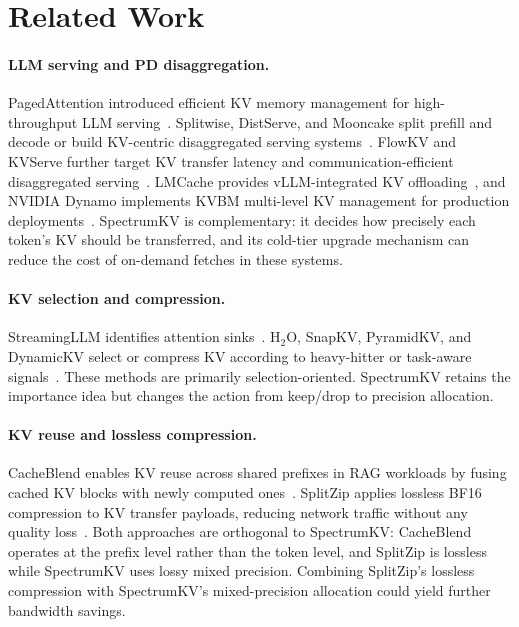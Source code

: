 \documentclass[11pt]{article}
\newcommand{\method}{SpectrumKV}
\theoremstyle{plain}
\theoremstyle{definition}
\begin{document}
\section{Related Work}
\label{sec:related}

\paragraph{LLM serving and PD disaggregation.}
PagedAttention introduced efficient KV memory management for high-throughput LLM serving~\citep{pagedattention}.  Splitwise, DistServe, and Mooncake split prefill and decode or build KV-centric disaggregated serving systems~\citep{splitwise,distserve,mooncake}.  FlowKV and KVServe further target KV transfer latency and communication-efficient disaggregated serving~\citep{flowkv,kvserve}.  LMCache provides vLLM-integrated KV offloading~\citep{lmcache}, and NVIDIA Dynamo implements KVBM multi-level KV management for production deployments~\citep{nvidiadynamo}.  \method{} is complementary: it decides how precisely each token's KV should be transferred, and its cold-tier upgrade mechanism can reduce the cost of on-demand fetches in these systems.

\paragraph{KV selection and compression.}
StreamingLLM identifies attention sinks~\citep{streamingllm}.  H$_2$O, SnapKV, PyramidKV, and DynamicKV select or compress KV according to heavy-hitter or task-aware signals~\citep{h2o,snapkv,pyramidkv,dynamickv}.  These methods are primarily selection-oriented.  \method{} retains the importance idea but changes the action from keep/drop to precision allocation.

\paragraph{KV reuse and lossless compression.}
CacheBlend enables KV reuse across shared prefixes in RAG workloads by fusing cached KV blocks with newly computed ones~\citep{cacheblend}.  SplitZip applies lossless BF16 compression to KV transfer payloads, reducing network traffic without any quality loss~\citep{splitzip}.  Both approaches are orthogonal to \method{}: CacheBlend operates at the prefix level rather than the token level, and SplitZip is lossless while \method{} uses lossy mixed precision.  Combining SplitZip's lossless compression with \method{}'s mixed-precision allocation could yield further bandwidth savings.
\end{document}
